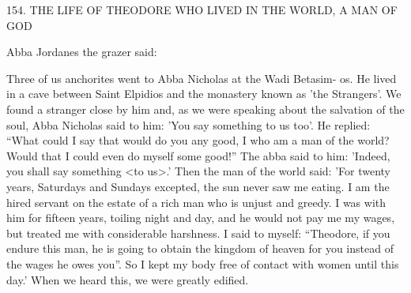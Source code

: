 154.
THE LIFE OF THEODORE WHO LIVED IN
THE WORLD, A MAN OF GOD

Abba Jordanes the grazer said:

Three of us anchorites went to Abba Nicholas at the Wadi Betasim-
os.
He lived in a cave between Saint Elpidios and the monastery
known as 'the Strangers'.
We found a stranger close by him and, as
we were speaking about the salvation of the soul, Abba Nicholas
said to him: 'You say something to us too'.
He replied: “What could
I say that would do you any good, I who am a man of the world?
Would that I could even do myself some good!” The abba said to
him: 'Indeed, you shall say something <to us>.' Then the man of
the world said: 'For twenty years, Saturdays and Sundays excepted,
the sun never saw me eating.
I am the hired servant on the estate of
a rich man who is unjust and greedy.
I was with him for fifteen
years, toiling night and day, and he would not pay me my wages,
but treated me with considerable harshness.
I said to myself:
“Theodore, if you endure this man, he is going to obtain the
kingdom of heaven for you instead of the wages he owes you”.
So
I kept my body free of contact with women until this day.' When
we heard this, we were greatly edified.

